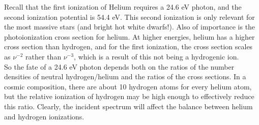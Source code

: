 \documentclass[10pt]{article}
\numberwithin{equation}{section}
\newcommand{\n}{\noindent}
\begin{document}
\n Recall that the first ionization of Helium requires a 24.6 eV photon, and the
second ionization potential is 54.4 eV. This second ionization is only relevant
for the most massive stars (and bright hot white dwarfs!). Also of importance is
the photoionization cross section for helium. At higher energies, helium has a 
higher cross section than hydrogen, and for the first ionization, the cross
section scales as $\nu^{-2}$ rather than $\nu^{-3}$, which is a result of this
not being a hydrogenic ion.\\

\n So the fate of a 24.6 eV photon depends both on the ratios of the number
densities of neutral hydrogen/helium and the ratios of the cross sections. In a
cosmic composition, there are about 10 hydrogen atoms for every helium atom,
but the relative ionization of hydrogen may be high enough to effectively
reduce this ratio. Clearly, the incident spectrum will affect the balance
between helium and hydrogen ionizations.\\
\end{document}
